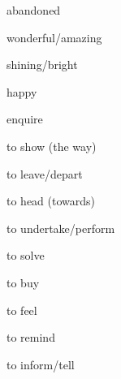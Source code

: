 \documentclass[avery5371,grid,frame]{flashcards}
\begin{document}
\begin{flashcard}{\LARGE abandoned}
\LARGE {}
\end{flashcard}
\begin{flashcard}{\LARGE wonderful/amazing}
\LARGE {}
\end{flashcard}
\begin{flashcard}{\LARGE shining/bright}
\LARGE {}
\end{flashcard}
\begin{flashcard}{\LARGE happy}
\LARGE {}
\end{flashcard}
\begin{flashcard}{\LARGE enquire}
\LARGE {}
\end{flashcard}
\begin{flashcard}{\LARGE to show (the way)}
\LARGE {}
\end{flashcard}
\begin{flashcard}{\LARGE to leave/depart}
\LARGE {}
\end{flashcard}
\begin{flashcard}{\LARGE to head (towards)}
\LARGE {}
\end{flashcard}
\begin{flashcard}{\LARGE to undertake/perform}
\LARGE {}
\end{flashcard}
\begin{flashcard}{\LARGE to solve}
\LARGE {}
\end{flashcard}
\begin{flashcard}{\LARGE to buy}
\LARGE {}
\end{flashcard}
\begin{flashcard}{\LARGE to feel}
\LARGE {}
\end{flashcard}
\begin{flashcard}{\LARGE to remind}
\LARGE {}
\end{flashcard}
\begin{flashcard}{\LARGE to inform/tell}
\LARGE {}
\end{flashcard}
\end{document}
